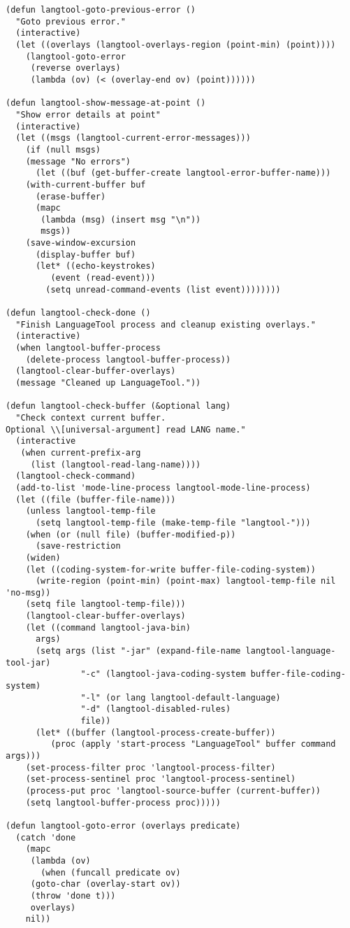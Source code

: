 \documentclass[11pt]{article}
\begin{document}
\begin{verbatim}
(defun langtool-goto-previous-error ()
  "Goto previous error."
  (interactive)
  (let ((overlays (langtool-overlays-region (point-min) (point))))
    (langtool-goto-error 
     (reverse overlays)
     (lambda (ov) (< (overlay-end ov) (point))))))

(defun langtool-show-message-at-point ()
  "Show error details at point"
  (interactive)
  (let ((msgs (langtool-current-error-messages)))
    (if (null msgs)
	(message "No errors")
      (let ((buf (get-buffer-create langtool-error-buffer-name)))
	(with-current-buffer buf
	  (erase-buffer)
	  (mapc
	   (lambda (msg) (insert msg "\n"))
	   msgs))
	(save-window-excursion
	  (display-buffer buf)
	  (let* ((echo-keystrokes)
		 (event (read-event)))
	    (setq unread-command-events (list event))))))))

(defun langtool-check-done ()
  "Finish LanguageTool process and cleanup existing overlays."
  (interactive)
  (when langtool-buffer-process
    (delete-process langtool-buffer-process))
  (langtool-clear-buffer-overlays)
  (message "Cleaned up LanguageTool."))

(defun langtool-check-buffer (&optional lang)
  "Check context current buffer.
Optional \\[universal-argument] read LANG name."
  (interactive
   (when current-prefix-arg
     (list (langtool-read-lang-name))))
  (langtool-check-command)
  (add-to-list 'mode-line-process langtool-mode-line-process)
  (let ((file (buffer-file-name)))
    (unless langtool-temp-file
      (setq langtool-temp-file (make-temp-file "langtool-")))
    (when (or (null file) (buffer-modified-p))
      (save-restriction
	(widen)
	(let ((coding-system-for-write buffer-file-coding-system))
	  (write-region (point-min) (point-max) langtool-temp-file nil 'no-msg))
	(setq file langtool-temp-file)))
    (langtool-clear-buffer-overlays)
    (let ((command langtool-java-bin)
	  args)
      (setq args (list "-jar" (expand-file-name langtool-language-tool-jar)
		       "-c" (langtool-java-coding-system buffer-file-coding-system)
		       "-l" (or lang langtool-default-language)
		       "-d" (langtool-disabled-rules)
		       file))
      (let* ((buffer (langtool-process-create-buffer))
	     (proc (apply 'start-process "LanguageTool" buffer command args)))
	(set-process-filter proc 'langtool-process-filter)
	(set-process-sentinel proc 'langtool-process-sentinel)
	(process-put proc 'langtool-source-buffer (current-buffer))
	(setq langtool-buffer-process proc)))))

(defun langtool-goto-error (overlays predicate)
  (catch 'done
    (mapc
     (lambda (ov)
       (when (funcall predicate ov)
	 (goto-char (overlay-start ov))
	 (throw 'done t)))
     overlays)
    nil))


\end{verbatim}
\end{document}
